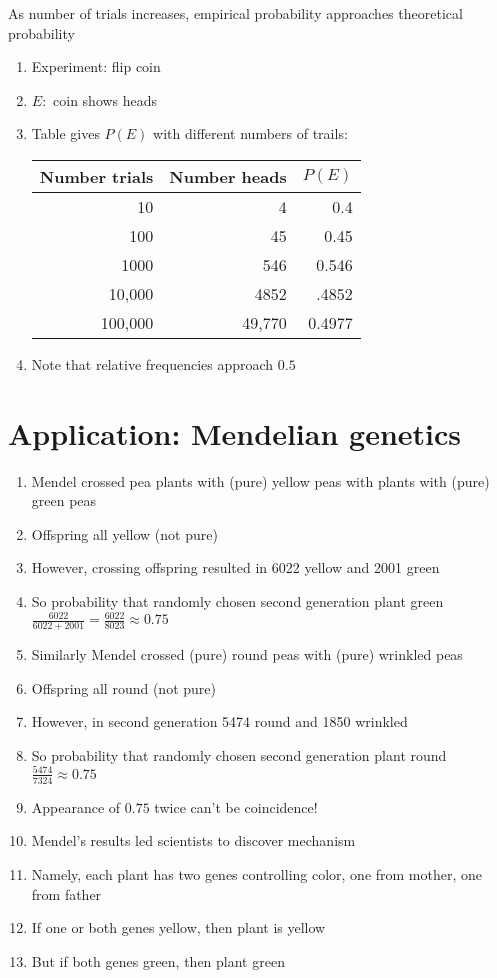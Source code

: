 \documentclass{ximera}
\begin{document}
\begin{theorem}
As number of trials increases, empirical probability
approaches theoretical probability
\end{theorem}

\begin{example}
\begin{enumerate}
\item Experiment: flip coin
\item $E:$ coin shows heads
\item Table gives $P\left(E\right)$ with different numbers of trails:
\begin{center}\begin{tabular}{rrr}
Number trials&Number heads&$P\left(E\right)$\\\toprule
10&4&0.4\\
100&45&0.45\\
1000&546&0.546\\
10,000&4852&.4852\\
100,000&49,770&0.4977
\end{tabular}\end{center}
\item Note that relative frequencies approach $0.5$
\end{enumerate}
\end{example}

\section{Application: Mendelian genetics}
\begin{enumerate}
\item Mendel crossed pea plants with (pure) yellow peas
with plants with (pure) green peas
\item Offspring all yellow (not pure)
\item However, crossing offspring resulted in 
6022 yellow and 2001 green
\item So probability that randomly chosen second generation plant green
$\frac{6022}{6022+2001}=\frac{6022}{8023}\approx 0.75$
\item Similarly Mendel crossed (pure) round peas with (pure) wrinkled peas
\item Offspring all round (not pure)
\item However, in second generation 5474 round and 1850 wrinkled
\item So probability that randomly chosen second generation plant round
$\frac{5474}{7324}\approx 0.75$
\item Appearance of $0.75$ twice can't be coincidence!
\item Mendel's results led scientists to discover mechanism
\item Namely, each plant has two genes controlling color, one
from mother, one from father
\item If one or both genes yellow, then plant is yellow
\item But if both genes green, then plant green
\end{enumerate}
\end{document}

